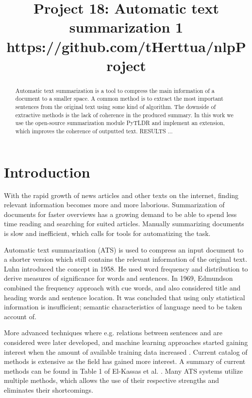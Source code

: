 \documentclass[conference]{IEEEtran}
\begin{document}
\title{Project 18: Automatic text summarization 1\\
{\footnotesize https://github.com/tHerttua/nlpProject
}
}

\author{
	\IEEEauthorblockA{}
\and
{}
\IEEEauthorblockA{}
\and
{}
\IEEEauthorblockA{}
\and
{}
\IEEEauthorblockA{}
}

\maketitle

\begin{abstract}
Automatic text summarization is a tool to compress the main information of a document to a smaller space. A common method is to extract the most important sentences from the original text using some kind of algorithm. The downside of extractive methods is the lack of coherence in the produced summary. In this work we use the open-source summarization module PyTLDR and implement an extension, which improves the coherence of outputted text. RESULTS ...
\end{abstract}

\section{Introduction}
With the rapid growth of news articles and other texts on the internet, finding relevant information becomes more and more laborious. Summarization of documents for faster overviews has a growing demand to be able to spend less time reading and searching for suited articles. Manually summarizing documents is slow and inefficient, which calls for tools for automatizing the task.

Automatic text summarization (ATS) is used to compress an input document to a shorter version which still contains the relevant information of the original text. Luhn \cite{luhn1958} introduced the concept in 1958. He used word frequency and distribution to derive measures of significance for words and sentences. In 1969, Edmundson \cite{edmundson1969} combined the frequency approach with cue words, and also considered title and heading words and sentence location. It was concluded that using only statistical information is insufficient; semantic characteristics of language need to be taken account of. 

More advanced techniques where e.g. relations between sentences and are considered were later developed, and machine learning approaches started gaining interest when the amount of available training data increased \cite{erkan2004}. Current catalog of methods is extensive as the field has gained more interest. A summary of current methods can be found in Table 1 of El-Kassas et al. \cite{el-kassas2020}. Many ATS systems utilize multiple methods, which allows the use of their respective strengths and eliminates their shortcomings.
\end{document}
